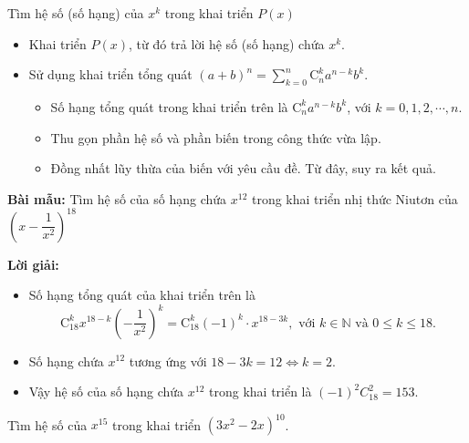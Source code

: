 \begin{dang}{Tìm hệ số (số hạng) của $x^k$ trong khai triển $P(x)$}
	\begin{itemize}
		\item [\ding{172}]  Khai triển $P(x)$, từ đó trả lời hệ số (số hạng) chứa $x^k$.
		\item [\ding{173}]  Sử dụng khai triển tổng quát $(a+b)^n=\displaystyle \sum\limits_{k=0}^n{\mathrm{C}_n^k{a}^{n-k}b^k}$.
		\begin{itemize}
			\item [$\bullet$] Số hạng tổng quát trong khai triển trên là $\mathrm{C}_n^k{a}^{n-k}b^k$, với $k=0,1,2,\cdots,n$.
			\item [$\bullet$] Thu gọn phần hệ số và phần biến trong công thức vừa lập.
			\item [$\bullet$] Đồng nhất lũy thừa của biến với yêu cầu đề. Từ đây, suy ra kết quả.
		\end{itemize}
	\end{itemize}
\end{dang}
	\noindent
	\begin{tcolorbox}[colframe=cyan,colback=red!3!white,boxrule=0.5mm]
		{\color{blue}\textbf{Bài mẫu: }}Tìm hệ số của số hạng chứa $x^{12}$ trong khai triển nhị thức Niutơn của $\left(x-\dfrac{1}{x^2}\right)^{18}$
	\end{tcolorbox}
	{\centerline{\color{violet}\textbf{Lời giải:}}}
	\begin{boxkn}
	\begin{itemize}
		\item [$\bullet$] Số hạng tổng quát của khai triển trên là $$\mathrm{C}_{18}^k{x}^{18-k}\left(-\dfrac{1}{x^2} \right) ^k=\mathrm{C}_{18}^k\left(-1\right)^k\cdot x^{18-3k}, \text { với } k \in \mathbb{N} \text{ và } 0 \le k \le 18.$$
		\item [$\bullet$] Số hạng chứa $x^{12}$ tương ứng với $18-3k=12\Leftrightarrow k=2$.
		\item [$\bullet$] Vậy hệ số của số hạng chứa $x^{12}$ trong khai triển là $\left(-1\right)^2C_{18}^2=153$.
	\end{itemize}
	\end{boxkn}
\begin{vd}%
	Tìm hệ số của $x^{15}$ trong khai triển $\left(3x^2-2x\right)^{10}$.
\end{vd} 
